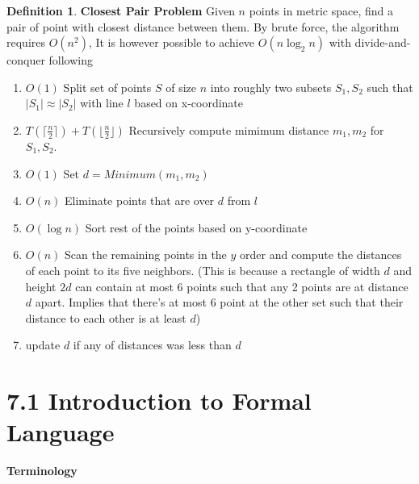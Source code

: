 \documentclass[11pt]{article}
\theoremstyle{plain}%
\theoremstyle{definition}
\newtheorem{defn}{Definition}
\theoremstyle{remark}
\begin{document}
\begin{defn}
  \label{closest pair problem}
  \textbf{Closest Pair Problem} Given $n$ points in metric space, find a pair of point with closest distance between them. By brute force, the algorithm requires $O(n^2)$, It is however possible to achieve $O(n\log_2{n})$ with divide-and-conquer following
  \begin{enumerate}
    \item $O(1)$ Split set of points $S$ of size $n$ into roughly two subsets $S_1, S_2$ such that $|S_1| \approx |S_2|$ with line $l$ based on x-coordinate
    \item $T(\lceil \frac{n}{2}\rceil) + T(\lfloor \frac{n}{2}\rfloor)$ Recursively compute mimimum distance $m_1, m_2$ for $S_1, S_2$.
    \item $O(1)$ Set $d = Minimum(m_1, m_2)$
    \item $O(n)$ Eliminate points that are over $d$ from $l$
    \item $O(\log{n})$ Sort rest of the points based on y-coordinate
    \item $O(n)$ Scan the remaining points in the $y$ order and compute the distances of each point to its five neighbors. (This is because a rectangle of width $d$ and height $2d$ can contain at most 6 points such that any 2 points are at distance $d$ apart. Implies that there's at most 6 point at the other set such that their distance to each other is at least $d$)
    \item update $d$ if any of distances was less than $d$
  \end{enumerate}

\end{defn}


\section*{7.1 Introduction to Formal Language}


\textbf{Terminology}
\end{document}
